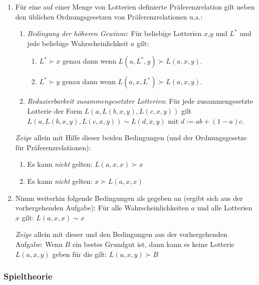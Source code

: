 \begin{enumerate}
  \item Für eine auf einer Menge von Lotterien definierte Präferenzrelation
  gilt neben den üblichen Ordnungsgesetzen von Präferenzrelationen u.a.:
  \begin{enumerate}
    \item {\em Bedingung der höheren Gewinne}: Für beliebige Lotterien $x$,$y$
  und $L^*$ und jede beliebige Wahrscheinlichkeit $a$ gilt: 
  \begin{enumerate}
     \item $L^* \succ x$ genau dann wenn $L(a, L^*, y) \succ L(a, x, y)$.
     \item $L^* \succ y$ genau dann wenn $L(a, x, L^*) \succ L(a, x, y)$.
  \end{enumerate}
  \item {\em Reduzierbarkeit zusammengesetzter Lotterien}:
  Für jede zusammengesetzte Lotterie der Form
  $L(a, L(b,x,y), L(c,x,y))$ gilt $L(a, L(b,x,y), L(c,x,y)) \sim L(d,x,y)$ mit $d:=ab+(1-a)c$. 
  \end{enumerate}
  {\em Zeige} allein mit Hilfe dieser beiden Bedingungen (und der
  Ordnungsgesetze für Präferenzrelationen):
  \begin{enumerate}
    \item Es kann {\em nicht} gelten: $L(a,x,x) \succ x$
    \item Es kann {\em nicht} gelten: $x \succ L(a,x,x)$ 
  \end{enumerate}  

  \item Nimm weiterhin folgende Bedingungen als gegeben an (ergibt sich aus
  der vorhergehenden Aufgabe): Für alle Wahrscheinlichkeiten $a$ und alle
  Lotterien $x$ gilt: $L(a,x,x) \sim x$

  {\em Zeige} allein mit dieser und den Bedingungen aus der vorhergehenden
  Aufgabe: Wenn $B$ ein bestes Grundgut ist, dann kann es keine Lotterie $L(a, x, y)$ geben
  für die gilt: $L(a, x, y) \succ B$
\end{enumerate}



\subsubsection{Spieltheorie}


